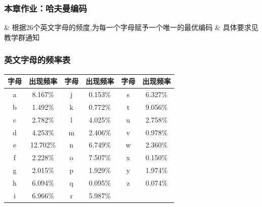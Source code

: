 \begin{frame}[fragile]
  \frametitle{本章作业：哈夫曼编码}
  \begin{easylist}
    &   根据26个英文字母的频度,为每一个字母赋予一个唯一的最优编码
    & 具体要求见教学群通知
  \end{easylist}


 
\end{frame}



\begin{frame}[fragile]
  \frametitle{英文字母的频率表}

  \begin{tabular}{|c | c || c | c || c | c| }
    \hline
    字母  & 出现频率 &  字母  & 出现频率  & 字母  & 出现频率 \\ \hline
    a & 8.167\% & j & 0.153\% & s & 6.327\% \\ \hline
    b & 1.492\% & k & 0.772\% & t & 9.056\% \\ \hline
    c & 2.782\% & l & 4.025\% & u & 2.758\% \\ \hline
    d & 4.253\% & m & 2.406\% & v & 0.978\% \\ \hline
    e & 12.702\% &  n & 6.749\% & w & 2.360\% \\ \hline
    f & 2.228\% & o & 7.507\% & x & 0.150\% \\ \hline
    g & 2.015\% & p & 1.929\% & y & 1.974\% \\ \hline
    h & 6.094\% & q & 0.095\% & z & 0.074\% \\ \hline
    i & 6.966\% & r & 5.987\% &    ~ &    \\ \hline
  \end{tabular}
\end{frame}
